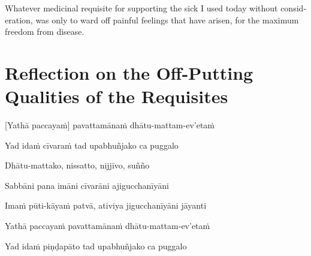 \begin{english}
  Whatever medicinal requisite for supporting the sick I used today without
  consideration, was only to ward off painful feelings that have arisen, for the
  maximum freedom from disease.\\
\end{english}

\section[Reflection on the Off-Putting Qualities]{Reflection on the Off-Putting Qualities of the Requisites}



\begin{leader}
\end{leader}


[Yathā paccayaṁ] pavattamānaṁ dhātu-mattam-ev'etaṁ


Yad idaṁ cīvaraṁ tad upabhuñjako ca puggalo


Dhātu-mattako, nissatto, nijjīvo, suñño


Sabbāni pana imāni cīvarāni ajigucchanīyāni


Imaṁ pūti-kāyaṁ patvā, ativiya jigucchanīyāni jāyanti


Yathā paccayaṁ pavattamānaṁ dhātu-mattam-ev'etaṁ


Yad idaṁ piṇḍapāto tad upabhuñjako ca puggalo

